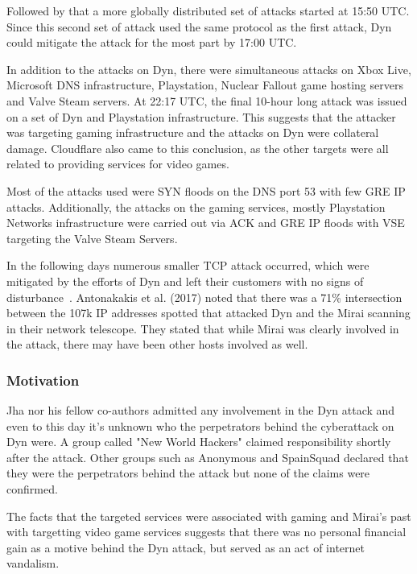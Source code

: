 Followed by that a more globally distributed set of attacks started at 15:50 UTC. Since this second set of attack used the same protocol as the first attack, Dyn could mitigate the attack for the most part by 17:00 UTC.\cite{Dyn16}

In addition to the attacks on Dyn, there were simultaneous attacks on Xbox Live, Microsoft DNS infrastructure, Playstation, Nuclear Fallout game hosting servers and Valve Steam servers.
At 22:17 UTC, the final 10-hour long attack was issued on a set of Dyn and Playstation infrastructure.\cite{Antonakakis17}
This suggests that the attacker was targeting gaming infrastructure and the attacks on Dyn were collateral damage.
Cloudflare also came to this conclusion, as the other targets were all related to providing services for video games.\cite{Cloudflare17}

Most of the attacks used were SYN floods on the DNS port 53 with few GRE IP attacks.
Additionally, the attacks on the gaming services, mostly Playstation Networks infrastructure were carried out via ACK and GRE IP floods with VSE targeting the Valve Steam Servers.\cite{Antonakakis17}

In the following days numerous smaller TCP attack occurred, which were mitigated by the efforts of Dyn and left their customers with no signs of disturbance~\cite{Dyn16}.
Antonakakis et al. (2017) noted that there was a 71\% intersection between the 107k IP addresses spotted that attacked Dyn and the Mirai scanning in their network telescope.
They stated that while Mirai was clearly involved in the attack, there may have been other hosts involved as well.\cite{Antonakakis17}

\subsubsection{Motivation}
Jha nor his fellow co-authors admitted any involvement in the Dyn attack and even to this day it's unknown who the perpetrators behind the cyberattack on Dyn were.
A group called "New World Hackers" claimed responsibility shortly after the attack.
Other groups such as Anonymous and SpainSquad declared that they were the perpetrators behind the attack but none of the claims were confirmed.\cite{Lewis17}

The facts that the targeted services were associated with gaming and Mirai's past with targetting video game services suggests that there was no personal financial gain as a motive behind the Dyn attack, but served as an act of internet vandalism.

